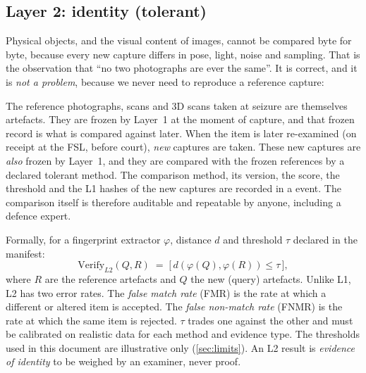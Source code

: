 \subsection{Layer 2: identity (tolerant)}
Physical objects, and the visual content of images, cannot be compared byte for byte, because every new capture differs in pose, light, noise and sampling. That is the observation that \enquote{no two photographs are ever the same}. It is correct, and it is \emph{not a problem}, because we never need to reproduce a reference capture:

\begin{keypoint}
The reference photographs, scans and 3D scans taken at seizure are themselves artefacts. They are frozen by Layer~1 at the moment of capture, and that frozen record is what is compared against later. When the item is later re-examined (on receipt at the FSL, before court), \emph{new} captures are taken. These new captures are \emph{also} frozen by Layer~1, and they are compared with the frozen references by a declared tolerant method. The comparison method, its version, the score, the threshold and the L1 hashes of the new captures are recorded in a  event. The comparison itself is therefore auditable and repeatable by anyone, including a defence expert.
\end{keypoint}

Formally, for a fingerprint extractor $\varphi$, distance $d$ and threshold $\tau$ declared in the manifest:
\[
\mathrm{Verify}_{L2}(Q, R) \;=\; \big[\, d(\varphi(Q), \varphi(R)) \le \tau \,\big],
\]
where $R$ are the reference artefacts and $Q$ the new (query) artefacts. Unlike L1, L2 has two error rates. The \emph{false match rate} (FMR) is the rate at which a different or altered item is accepted. The \emph{false non-match rate} (FNMR) is the rate at which the same item is rejected. $\tau$ trades one against the other and must be calibrated on realistic data for each method and evidence type. The thresholds used in this document are illustrative only (\cref{sec:limits}). An L2 result is \emph{evidence of identity} to be weighed by an examiner, never proof.

